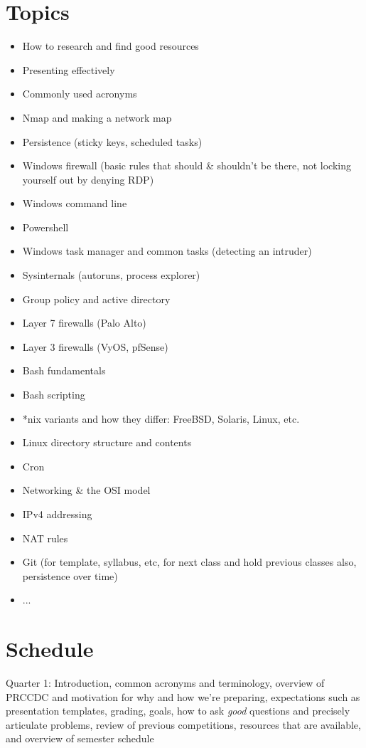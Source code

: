 \documentclass{article}
\begin{document}
\section*{Topics}
	\begin{itemize}
	\item How to research and find good resources
	\item Presenting effectively
	\item Commonly used acronyms
	\item Nmap and making a network map
	\item Persistence (sticky keys, scheduled tasks)
	\item Windows firewall (basic rules that should \& shouldn't be there, not locking yourself out by denying RDP)
	\item Windows command line
	\item Powershell
	\item Windows task manager and common tasks (detecting an intruder)
	\item Sysinternals (autoruns, process explorer)
	\item Group policy and active directory
	\item Layer 7 firewalls (Palo Alto)
	\item Layer 3 firewalls (VyOS, pfSense)
	\item Bash fundamentals
	\item Bash scripting
	\item *nix variants and how they differ: FreeBSD, Solaris, Linux, etc.
	\item Linux directory structure and contents
	\item Cron
	\item Networking \& the OSI model
	\item IPv4 addressing
	\item NAT rules
	\item Git (for template, syllabus, etc, for next class and hold previous classes also, persistence over time)
	\item ...
	\end{itemize}

\section*{Schedule}
Quarter 1: Introduction, common acronyms and terminology, overview of PRCCDC and motivation for why and how we're preparing, expectations such as presentation templates, grading, goals, how to ask \emph{good} questions and precisely articulate problems, review of previous competitions, resources that are available, and overview of semester schedule\\
\end{document}
